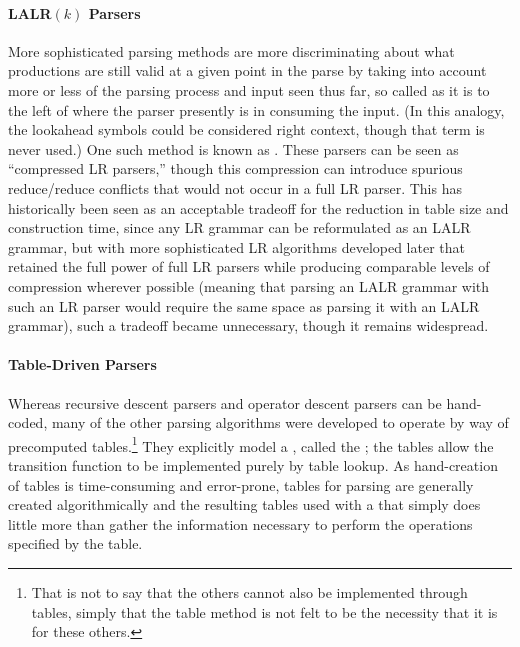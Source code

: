 \paragraph{LALR$(k)$ Parsers}
More sophisticated parsing methods are more discriminating about what productions are still valid at a given point in the parse by taking into account more or less of the parsing process and input seen thus far, so called  as it is to the left of where the parser presently is in consuming the input. (In this analogy, the lookahead symbols could be considered right context, though that term is never used.) One such method is known as . These parsers can be seen as ``compressed LR parsers,'' though this compression can introduce spurious reduce/reduce conflicts that would not occur in a full LR parser. This has historically been seen as an acceptable tradeoff for the reduction in table size and construction time, since any LR grammar can be reformulated as an LALR grammar, but with more sophisticated LR algorithms developed later that retained the full power of full LR parsers while producing comparable levels of compression wherever possible (meaning that parsing an LALR grammar with such an LR parser would require the same space as parsing it with an LALR grammar), such a tradeoff became unnecessary, though it remains widespread. 


\paragraph{Table-Driven Parsers}
Whereas recursive descent parsers and operator descent parsers can be hand-coded, many of the other parsing algorithms were developed to operate by way of precomputed tables.\footnote{That is not to say that the others cannot also be implemented through tables, simply that the table method is not felt to be the necessity that it is for these others.} They explicitly model a \FA, called the ; the tables allow the transition function to be implemented purely by table lookup. As hand-creation of tables is time-consuming and error-prone, tables for parsing are generally created algorithmically and the resulting tables used with a  that simply does little more than gather the information necessary to perform the operations specified by the table.

